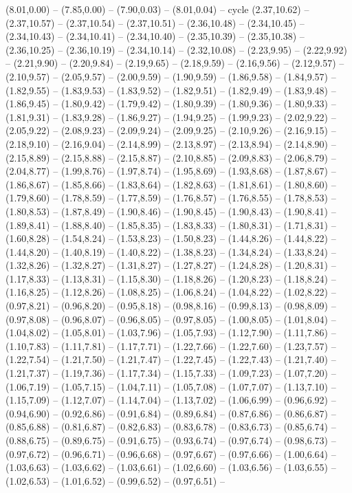 \expandafter\def\csname geo:gebiet:ITA\endcsname{
  (8.01,0.00) -- (7.85,0.00) -- (7.90,0.03) -- (8.01,0.04) -- cycle}
\expandafter\def\csname geo:gebiet:NLD\endcsname{
  (2.37,10.62) -- (2.37,10.57) -- (2.37,10.54) -- (2.37,10.51) -- (2.36,10.48) -- (2.34,10.45) -- (2.34,10.43) -- (2.34,10.41) -- (2.34,10.40) -- (2.35,10.39) -- (2.35,10.38) -- (2.36,10.25) -- (2.36,10.19) -- (2.34,10.14) -- (2.32,10.08) -- (2.23,9.95) -- (2.22,9.92) -- (2.21,9.90) -- (2.20,9.84) -- (2.19,9.65) -- (2.18,9.59) -- (2.16,9.56) -- (2.12,9.57) -- (2.10,9.57) -- (2.05,9.57) -- (2.00,9.59) -- (1.90,9.59) -- (1.86,9.58) -- (1.84,9.57) -- (1.82,9.55) -- (1.83,9.53) -- (1.83,9.52) -- (1.82,9.51) -- (1.82,9.49) -- (1.83,9.48) -- (1.86,9.45) -- (1.80,9.42) -- (1.79,9.42) -- (1.80,9.39) -- (1.80,9.36) -- (1.80,9.33) -- (1.81,9.31) -- (1.83,9.28) -- (1.86,9.27) -- (1.94,9.25) -- (1.99,9.23) -- (2.02,9.22) -- (2.05,9.22) -- (2.08,9.23) -- (2.09,9.24) -- (2.09,9.25) -- (2.10,9.26) -- (2.16,9.15) -- (2.18,9.10) -- (2.16,9.04) -- (2.14,8.99) -- (2.13,8.97) -- (2.13,8.94) -- (2.14,8.90) -- (2.15,8.89) -- (2.15,8.88) -- (2.15,8.87) -- (2.10,8.85) -- (2.09,8.83) -- (2.06,8.79) -- (2.04,8.77) -- (1.99,8.76) -- (1.97,8.74) -- (1.95,8.69) -- (1.93,8.68) -- (1.87,8.67) -- (1.86,8.67) -- (1.85,8.66) -- (1.83,8.64) -- (1.82,8.63) -- (1.81,8.61) -- (1.80,8.60) -- (1.79,8.60) -- (1.78,8.59) -- (1.77,8.59) -- (1.76,8.57) -- (1.76,8.55) -- (1.78,8.53) -- (1.80,8.53) -- (1.87,8.49) -- (1.90,8.46) -- (1.90,8.45) -- (1.90,8.43) -- (1.90,8.41) -- (1.89,8.41) -- (1.88,8.40) -- (1.85,8.35) -- (1.83,8.33) -- (1.80,8.31) -- (1.71,8.31) -- (1.60,8.28) -- (1.54,8.24) -- (1.53,8.23) -- (1.50,8.23) -- (1.44,8.26) -- (1.44,8.22) -- (1.44,8.20) -- (1.40,8.19) -- (1.40,8.22) -- (1.38,8.23) -- (1.34,8.24) -- (1.33,8.24) -- (1.32,8.26) -- (1.32,8.27) -- (1.31,8.27) -- (1.27,8.27) -- (1.24,8.28) -- (1.20,8.31) -- (1.17,8.33) -- (1.13,8.31) -- (1.15,8.30) -- (1.18,8.26) -- (1.20,8.23) -- (1.18,8.24) -- (1.16,8.25) -- (1.12,8.26) -- (1.08,8.25) -- (1.06,8.24) -- (1.04,8.22) -- (1.02,8.22) -- (0.97,8.21) -- (0.96,8.20) -- (0.95,8.18) -- (0.98,8.16) -- (0.99,8.13) -- (0.98,8.09) -- (0.97,8.08) -- (0.96,8.07) -- (0.96,8.05) -- (0.97,8.05) -- (1.00,8.05) -- (1.01,8.04) -- (1.04,8.02) -- (1.05,8.01) -- (1.03,7.96) -- (1.05,7.93) -- (1.12,7.90) -- (1.11,7.86) -- (1.10,7.83) -- (1.11,7.81) -- (1.17,7.71) -- (1.22,7.66) -- (1.22,7.60) -- (1.23,7.57) -- (1.22,7.54) -- (1.21,7.50) -- (1.21,7.47) -- (1.22,7.45) -- (1.22,7.43) -- (1.21,7.40) -- (1.21,7.37) -- (1.19,7.36) -- (1.17,7.34) -- (1.15,7.33) -- (1.09,7.23) -- (1.07,7.20) -- (1.06,7.19) -- (1.05,7.15) -- (1.04,7.11) -- (1.05,7.08) -- (1.07,7.07) -- (1.13,7.10) -- (1.15,7.09) -- (1.12,7.07) -- (1.14,7.04) -- (1.13,7.02) -- (1.06,6.99) -- (0.96,6.92) -- (0.94,6.90) -- (0.92,6.86) -- (0.91,6.84) -- (0.89,6.84) -- (0.87,6.86) -- (0.86,6.87) -- (0.85,6.88) -- (0.81,6.87) -- (0.82,6.83) -- (0.83,6.78) -- (0.83,6.73) -- (0.85,6.74) -- (0.88,6.75) -- (0.89,6.75) -- (0.91,6.75) -- (0.93,6.74) -- (0.97,6.74) -- (0.98,6.73) -- (0.97,6.72) -- (0.96,6.71) -- (0.96,6.68) -- (0.97,6.67) -- (0.97,6.66) -- (1.00,6.64) -- (1.03,6.63) -- (1.03,6.62) -- (1.03,6.61) -- (1.02,6.60) -- (1.03,6.56) -- (1.03,6.55) -- (1.02,6.53) -- (1.01,6.52) -- (0.99,6.52) -- (0.97,6.51) -- }
